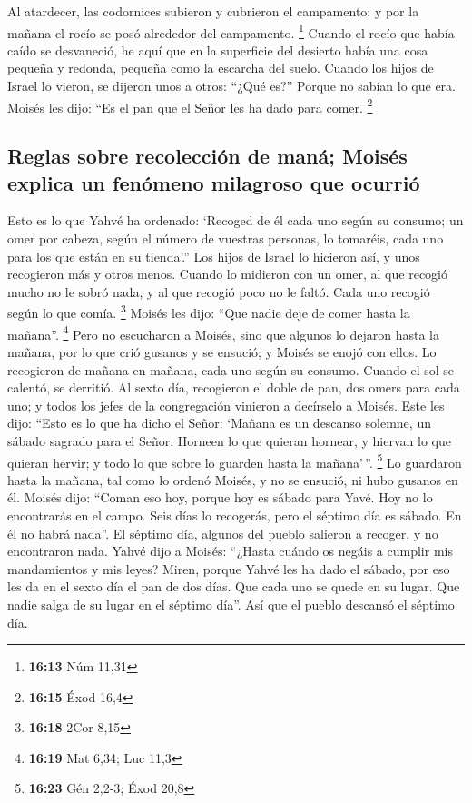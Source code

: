 \begin{paracol}{2}
 Al atardecer, las codornices subieron y cubrieron el
campamento; y por la mañana el rocío se posó alrededor del campamento.
\footnote{\textbf{16:13} Núm 11,31}  Cuando el rocío que
había caído se desvaneció, he aquí que en la superficie del desierto
había una cosa pequeña y redonda, pequeña como la escarcha del suelo.
 Cuando los hijos de Israel lo vieron, se dijeron unos a
otros: ``¿Qué es?'' Porque no sabían lo que era. Moisés les dijo: ``Es
el pan que el Señor les ha dado para comer. \footnote{\textbf{16:15}
  Éxod 16,4}

\hypertarget{reglas-sobre-recolecciuxf3n-de-manuxe1-moisuxe9s-explica-un-fenuxf3meno-milagroso-que-ocurriuxf3}{%
\subsection{Reglas sobre recolección de maná; Moisés explica un fenómeno
milagroso que
ocurrió}\label{reglas-sobre-recolecciuxf3n-de-manuxe1-moisuxe9s-explica-un-fenuxf3meno-milagroso-que-ocurriuxf3}}

 Esto es lo que Yahvé ha ordenado: `Recoged de él cada
uno según su consumo; un omer por cabeza, según el número de vuestras
personas, lo tomaréis, cada uno para los que están en su tienda'.''
 Los hijos de Israel lo hicieron así, y unos recogieron
más y otros menos.  Cuando lo midieron con un omer, al
que recogió mucho no le sobró nada, y al que recogió poco no le faltó.
Cada uno recogió según lo que comía. \footnote{\textbf{16:18} 2Cor 8,15}
 Moisés les dijo: ``Que nadie deje de comer hasta la
mañana''. \footnote{\textbf{16:19} Mat 6,34; Luc 11,3} 
Pero no escucharon a Moisés, sino que algunos lo dejaron hasta la
mañana, por lo que crió gusanos y se ensució; y Moisés se enojó con
ellos.  Lo recogieron de mañana en mañana, cada uno según
su consumo. Cuando el sol se calentó, se derritió.  Al
sexto día, recogieron el doble de pan, dos omers para cada uno; y todos
los jefes de la congregación vinieron a decírselo a Moisés.
 Este les dijo: ``Esto es lo que ha dicho el Señor:
`Mañana es un descanso solemne, un sábado sagrado para el Señor. Horneen
lo que quieran hornear, y hiervan lo que quieran hervir; y todo lo que
sobre lo guarden hasta la mañana'\,''. \footnote{\textbf{16:23} Gén
  2,2-3; Éxod 20,8}  Lo guardaron hasta la mañana, tal
como lo ordenó Moisés, y no se ensució, ni hubo gusanos en él.
 Moisés dijo: ``Coman eso hoy, porque hoy es sábado para
Yavé. Hoy no lo encontrarás en el campo.  Seis días lo
recogerás, pero el séptimo día es sábado. En él no habrá nada''.
 El séptimo día, algunos del pueblo salieron a recoger, y
no encontraron nada.  Yahvé dijo a Moisés: ``¿Hasta
cuándo os negáis a cumplir mis mandamientos y mis leyes? 
Miren, porque Yahvé les ha dado el sábado, por eso les da en el sexto
día el pan de dos días. Que cada uno se quede en su lugar. Que nadie
salga de su lugar en el séptimo día''.  Así que el pueblo
descansó el séptimo día.


\end{paracol}
